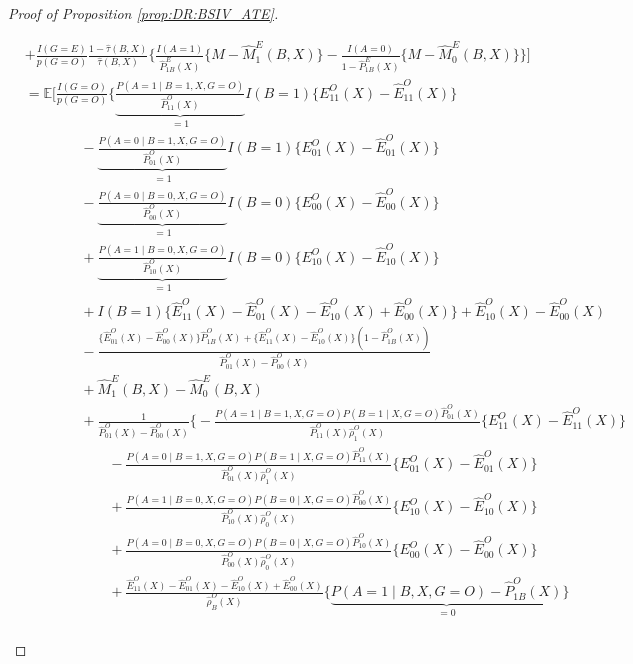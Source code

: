 \documentclass[10pt]{article}
\newcommand{\E}{\mathbb{E}}
\begin{document}
\begin{proof}[Proof of Proposition \ref{prop:DR:BSIV_ATE}]
\begin{itemize}
{\begin{align*}
    &+\frac{I(G=E)}{p(G=O)}\frac{1-\hat{\tau}(B,X)}{\hat{\tau}(B,X)}\bigg\{\frac{I(A=1)}{\hat{P}_{1B}^E(X)}\{M-\hat{M}_1^E(B,X)\}-\frac{I(A=0)}{1-\hat{P}_{1B}^E(X)}\{M-\hat{M}_0^E(B,X)\}\bigg\}\Big]\\
    &=\E\Big[\frac{I(G=O)}{p(G=O)}\Bigg\{\underbrace{\frac{P(A=1\mid B=1,X,G=O)}{\hat{P}_{11}^O(X)}}_{=1}I(B=1)\{E_{11}^O(X)-\hat{E}_{11}^O(X)\}\\
    &\ \ \ \ \ \ \ \ \ \ \ \ \ \ \ \ \ \ -\underbrace{\frac{P(A=0\mid B=1,X,G=O)}{\hat{P}_{01}^O(X)}}_{=1}I(B=1)\{E_{01}^O(X)-\hat{E}_{01}^O(X)\}\\
    &\ \ \ \ \ \ \ \ \ \ \ \ \ \ \ \ \ \ -\underbrace{\frac{P(A=0\mid B=0,X,G=O)}{\hat{P}_{00}^O(X)}}_{=1}I(B=0)\{E_{00}^O(X)-\hat{E}_{00}^O(X)\}\\
    &\ \ \ \ \ \ \ \ \ \ \ \ \ \ \ \ \ \ +\underbrace{\frac{P(A=1\mid B=0,X,G=O)}{\hat{P}_{10}^O(X)}}_{=1}I(B=0)\{E_{10}^O(X)-\hat{E}_{10}^O(X)\}\\
    &\ \ \ \ \ \ \ \ \ \ \ \ \ \ \ \ \ \ +I(B=1)\{\hat{E}_{11}^O(X)-\hat{E}_{01}^O(X)-\hat{E}_{10}^O(X)+\hat{E}_{00}^O(X)\}+\hat{E}_{10}^O(X)-\hat{E}_{00}^O(X)\\
    &\ \ \ \ \ \ \ \ \ \ \ \ \ \ \ \ \ \ -\frac{\{\hat{E}_{01}^O(X)-\hat{E}_{00}^O(X)\}\hat{P}_{1B}^O(X)+\{\hat{E}_{11}^O(X)-\hat{E}_{10}^O(X)\}(1-\hat{P}_{1B}^O(X))}{\hat{P}_{01}^O(X)-\hat{P}_{00}^O(X)}\\
    &\ \ \ \ \ \ \ \ \ \ \ \ \ \ \ \ \ \ +\hat{M}_1^E(B,X)-\hat{M}_0^E(B,X)\\
    &\ \ \ \ \ \ \ \ \ \ \ \ \ \ \ \ \ \ +\frac{1}{\hat{P}_{01}^O(X)-\hat{P}_{00}^O(X)}\bigg\{-\frac{P(A=1\mid B=1,X,G=O)P(B=1\mid X,G=O)\hat{P}_{01}^O(X)}{\hat{P}_{11}^O(X)\hat{\rho}_1^O(X)}\{E_{11}^O(X)-\hat{E}_{11}^O(X)\}\\
    &~~~~~~~~~~~~~~~~~~~~~~~~~~~-\frac{P(A=0\mid B=1,X,G=O)P(B=1\mid X,G=O)\hat{P}_{11}^O(X)}{\hat{P}_{01}^O(X)\hat{\rho}_1^O(X)}\{E_{01}^O(X)-\hat{E}_{01}^O(X)\}\\
    &~~~~~~~~~~~~~~~~~~~~~~~~~~~+\frac{P(A=1\mid B=0,X,G=O)P(B=0\mid X,G=O)\hat{P}_{00}^O(X)}{\hat{P}_{10}^O(X)\hat{\rho}_0^O(X)}\{E_{10}^O(X)-\hat{E}_{10}^O(X)\}\\
    &~~~~~~~~~~~~~~~~~~~~~~~~~~~+\frac{P(A=0\mid B=0,X,G=O)P(B=0\mid X,G=O)\hat{P}_{10}^O(X)}{\hat{P}_{00}^O(X)\hat{\rho}_0^O(X)}\{E_{00}^O(X)-\hat{E}_{00}^O(X)\}\\
    &~~~~~~~~~~~~~~~~~~~~~~~~~~~+\frac{\hat{E}_{11}^O(X)-\hat{E}_{01}^O(X)-\hat{E}_{10}^O(X)+\hat{E}_{00}^O(X)}{\hat{\rho}_B^O(X)}\big\{\underbrace{P(A=1\mid B,X,G=O)-\hat{P}_{1B}^O(X)}_{=0}\big\}\\

\end{align*}}
\end{itemize}
\end{proof}
\end{document}

